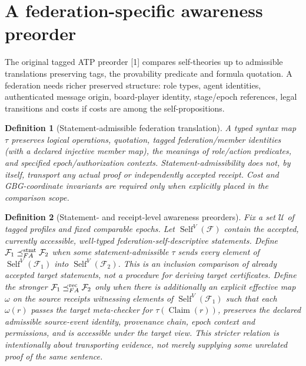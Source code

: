 \documentclass[10pt,letterpaper]{article}
\newtheorem{definition}{Definition}[section]
\theoremstyle{remark}\newtheorem{remark}[definition]{Remark}
\newcommand{\F}{\mathcal{F}}
\newcommand{\Self}{\operatorname{Self}}
\begin{document}
\section{A federation-specific awareness preorder}
The original tagged ATP preorder [1] compares self-theories up to admissible translations preserving tags, the provability predicate and formula quotation. A federation needs richer preserved structure: role types, agent identities, authenticated message origin, board-player identity, stage/epoch references, legal transitions and costs if costs are among the self-propositions.

\begin{definition}[Statement-admissible federation translation]
A typed syntax map $\tau$ preserves logical operations, quotation, tagged federation/member identities (with a declared injective member map), the meanings of role/action predicates, and specified epoch/authorization contexts. \emph{Statement-admissibility} does not, by itself, transport any actual proof or independently accepted receipt. Cost and GBG-coordinate invariants are required only when explicitly placed in the comparison scope.
\end{definition}

\begin{definition}[Statement- and receipt-level awareness preorders]
Fix a \emph{set} $\mathcal U$ of tagged profiles and fixed comparable epochs. Let $\Self^V(\F)$ contain the accepted, currently accessible, well-typed federation-self-descriptive \emph{statements}. Define $\F_1\preceq^{\rm stmt}_{FA}\F_2$ when some statement-admissible $\tau$ sends every element of $\Self^V(\F_1)$ into $\Self^V(\F_2)$. This is an inclusion comparison of already accepted target statements, \emph{not} a procedure for deriving target certificates. Define the stronger $\F_1\preceq^{\rm rec}_{FA}\F_2$ only when there is additionally an explicit effective map $\omega$ on the source receipts \emph{witnessing elements of} $\Self^V(\F_1)$ such that each $\omega(r)$ passes the target meta-checker for $\tau(\operatorname{Claim}(r))$, preserves the declared admissible \emph{source-event identity, provenance chain, epoch context and permissions}, and is accessible under the target view. This stricter relation is intentionally about transporting evidence, not merely supplying some unrelated proof of the same sentence.
\end{definition}
\end{document}
